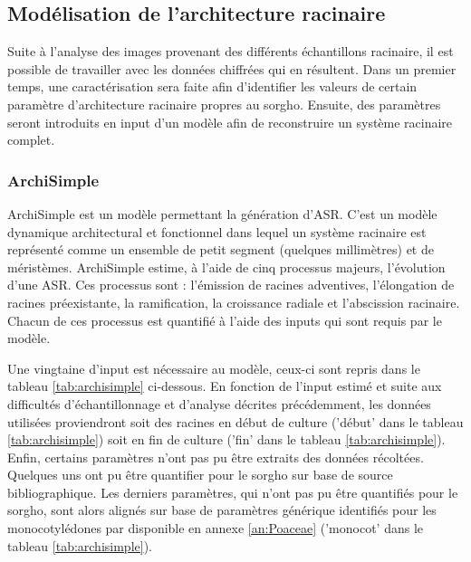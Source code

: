 \subsection{Modélisation de l'architecture racinaire}

Suite à l'analyse des images provenant des différents échantillons racinaire, il est possible de travailler avec les données chiffrées qui en résultent.
Dans un premier temps, une caractérisation sera faite afin d'identifier les valeurs de certain paramètre d'architecture racinaire propres au sorgho.
Ensuite, des paramètres seront introduits en input d'un modèle afin de reconstruire un système racinaire complet.

\subsubsection{ArchiSimple}

ArchiSimple  \citep{pages_calibration_2014} est un modèle permettant la génération d'ASR.
C'est un modèle dynamique architectural et fonctionnel dans lequel un système racinaire est représenté comme un ensemble de petit segment (quelques millimètres) et de méristèmes.
ArchiSimple estime, à l'aide de cinq processus majeurs, l'évolution d'une ASR.
Ces processus sont : l'émission de racines adventives, l'élongation de racines préexistante, la ramification, la croissance radiale et l'abscission racinaire.
Chacun de ces processus est quantifié à l'aide des inputs qui sont requis par le modèle.
\newline

Une vingtaine d'input est nécessaire au modèle, ceux-ci sont repris dans le tableau \ref{tab:archisimple} ci-dessous.
En fonction de l'input estimé et suite aux difficultés d'échantillonnage et d'analyse décrites précédemment, les données utilisées proviendront soit des racines en début de culture ('début' dans le tableau \ref{tab:archisimple}) soit en fin de culture ('fin' dans le tableau \ref{tab:archisimple}).
Enfin, certains paramètres n'ont pas pu être extraits des données récoltées.
Quelques uns ont pu être quantifier pour le sorgho sur base de source bibliographique.
Les derniers paramètres, qui n'ont pas pu être quantifiés pour le sorgho, sont alors alignés sur base de paramètres générique identifiés pour les monocotylédones par \cite{gerard_modelling_2017} disponible en annexe \ref{an:Poaceae} ('monocot' dans le tableau \ref{tab:archisimple}).

\newpage 

